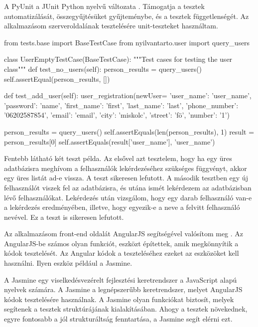 A PyUnit a JUnit Python nyelvű változata \cite{python_test}. Támogatja a tesztek automatizálását, összegyűjtésüket gyűjteménybe, és a tesztek függetlenségét. Az alkalmazásom szerveroldalának tesztelésére unit-teszteket használtam.

\begin{python}
from tests.base import BaseTestCase
from nyilvantarto.user import query_users

class UserEmptyTestCase(BaseTestCase):
 """Test cases for testing the user class"""
    def test_no_users(self):
        person_results = query_users()
        self.assertEqual(person_results, [])

    def test_add_user(self):
        user_registration(newUser=
            {'user_name': 'user_name', 'password': 'name',
             'first_name': 'first', 'last_name': 'last',
             'phone_number': '06202587854', 'email': 'email',
             'city': 'miskolc', 'street': 'f\"o',
             'number': '1'})

        person_results = query_users()
        self.assertEquals(len(person_results), 1)
        result = person_results[0]
        self.assertEquals(result['user_name'], 'user_name')
\end{python}

\newpage

Fentebb látható két teszt példa. Az elsővel azt tesztelem, hogy ha egy üres adatbázisra meghívom a felhasználók lekérdezéséhez szükséges függvényt, akkor egy üres listát ad-e vissza. A teszt sikeresen lefutott. A második tesztben egy új felhasználót viszek fel az adatbázisra, és utána ismét lekérdezem az adatbázisban lévő felhasználókat. Lekérdezés után vizsgálom, hogy egy darab felhasználó van-e a lekérdezés eredményében, illetve, hogy egyezik-e a neve a felvitt felhasználó nevével. Ez a teszt is sikeresen lefutott.


Az alkalmazásom front-end oldalát AngularJS segítségével valósítom meg \cite{angular_test}. Az AngularJS-be számos olyan funkciót, eszközt építettek, amik megkönnyítik a kódok tesztelését. Az Angular kódok a teszteléséhez ezeket az eszközöket kell használni. Ilyen eszköz például a Jasmine.

A Jasmine egy viselkedésvezérelt fejlesztési keretrendszer a JavaScript alapú nyelvek számára. A Jasmine a legnépszerűbb keretrendszer, melyet AngularJS kódok tesztelésére használnak. A Jasmine olyan funkciókat biztosít, melyek segítenek a tesztek struktúrájának kialakításában. Ahogy a tesztek növekednek, egyre fontosabb a jól strukturáltság fenntartása, a Jasmine segít elérni ezt.

